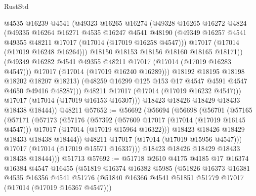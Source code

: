 \begin{lexlean}{RustStd}
\begin{coremodule}
                    @4535
                    @16239
                    @4541
                    (@49323
                      @16265
                      @16274
                      (@49328
                        @16265
                        @16272
                        @4824
                        (@49335
                          @16264
                          @16271
                          @4535
                          @16247
                          @4541
                          @48190
                          (@49349 @16257 @4541 @49355 @48211 @17017 (@17014 (@17019 @16258 @4547)))
                          @17017
                          (@17014 (@17019 @16248 @16264)))
                        @18150
                        @18153
                        @18156
                        @18160
                        @18165
                        @18171))
                    (@49349 @16282 @4541 @49355 @48211 @17017 (@17014 (@17019 @16283 @4547)))
                    @17017
                    (@17014 (@17019 @16240 @16289)))
                  @18192
                  @18195
                  @18198
                  @18202
                  @18207
                  @18213)
                (@48259 @16299 @125 @153 @17 @4547 @4591 @4547 @4650 @49416 @48287)))
            @48211
            @17017
            (@17014 (@17019 @16232 @4547)))
          @17017
          (@17014 (@17019 @16153 @16307)))
        @18423
        @18426
        @18429
        @18433
        @18438
        @18444))
    @48211
@57652 := @56692
    (@56694
      (@56698
        (@56701
          (@57165
            (@57171
              (@57173
                (@57176
                  (@57392
                    (@57609 @17017 (@17014 (@17019 @16145 @4547)))
                    @17017
                    (@17014 (@17019 @15964 @16322)))
                  @18423
                  @18426
                  @18429
                  @18433
                  @18438
                  @18444))
              @48211
              @17017
              (@17014 (@17019 @15956 @4547)))
            @17017
            (@17014 (@17019 @15571 @16337)))
          @18423
          @18426
          @18429
          @18433
          @18438
          @18444)))
    @51713
@57692 := @51718
    @2610
    @4175
    @4185
    @17
    @16374
    @16384
    @4547
    @16455
    (@51819
      @16374
      @16382
      @5985
      (@51826
        @16373
        @16381
        @4535
        @16356
        @4541
        @51776
        (@51840 @16366 @4541 @51851 @51779 @17017 (@17014 (@17019 @16367 @4547)))

\end{coremodule}
\end{lexlean}
